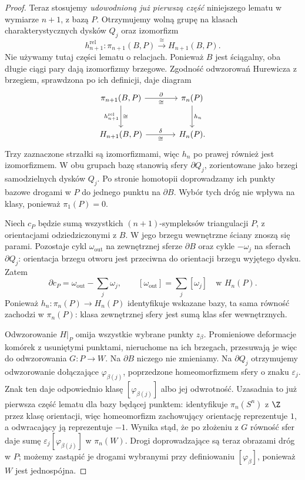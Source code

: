 \begin{proof}
Teraz stosujemy \emph{udowodnioną już pierwszą część}
niniejszego lematu w wymiarze $n+1$, z bazą $P$.
Otrzymujemy wolną grupę na klasach charakterystycznych
dysków $Q_j$ oraz izomorfizm
\[
 h_{n+1}^{\mathrm{rel}}:
 \pi_{n+1}(B,P)\xrightarrow{\ \cong\ }H_{n+1}(B,P).
\]
Nie używamy tutaj części lematu o relacjach.
Ponieważ $B$ jest ściągalny, oba długie ciągi pary dają
izomorfizmy brzegowe. Zgodność odwzorowań Hurewicza
z brzegiem, sprawdzona po ich definicji, daje diagram
\[
\begin{tikzcd}[column sep=large,row sep=large]
 \pi_{n+1}(B,P) \arrow[r,"\partial","\cong"']
  \arrow[d,"h_{n+1}^{\mathrm{rel}}" left,"\cong" right]
 &\pi_n(P) \arrow[d,"h_n"]\\
 H_{n+1}(B,P) \arrow[r,"\delta","\cong"']
 &H_n(P).
\end{tikzcd}
\]
Trzy zaznaczone strzałki są izomorfizmami, więc $h_n$
po prawej również jest izomorfizmem. W obu grupach bazę
stanowią sfery $\partial Q_j$, zorientowane jako brzegi
samodzielnych dysków $Q_j$. Po stronie homotopii doprowadzamy
ich punkty bazowe drogami w $P$ do jednego punktu na $\partial B$.
Wybór tych dróg nie wpływa na klasy, ponieważ $\pi_1(P)=0$.

Niech $c_P$ będzie sumą wszystkich $(n+1)$-sympleksów
triangulacji $P$, z orientacjami odziedziczonymi z $B$.
W jego brzegu wewnętrzne ściany znoszą się parami.
Pozostaje cykl $\omega_{\mathrm{out}}$ na zewnętrznej
sferze $\partial B$ oraz cykle $-\omega_j$ na sferach
$\partial Q_j$: orientacja brzegu otworu jest przeciwna
do orientacji brzegu wyjętego dysku. Zatem
\[
 \partial c_P=\omega_{\mathrm{out}}-\sum_j\omega_j,
 \qquad
 [\omega_{\mathrm{out}}]=\sum_j[\omega_j]
 \quad\text{w }H_n(P).
\]
Ponieważ $h_n:\pi_n(P)\to H_n(P)$ identyfikuje wskazane
bazy, ta sama równość zachodzi w $\pi_n(P)$:
klasa zewnętrznej sfery jest sumą klas sfer wewnętrznych.

Odwzorowanie $H|_P$ omija wszystkie wybrane punkty $z_\beta$.
Promieniowe deformacje komórek z usuniętymi punktami,
nieruchome na ich brzegach, przesuwają je więc do
odwzorowania $G:P\to W$. Na $\partial B$ niczego nie zmieniamy.
Na $\partial Q_j$ otrzymujemy odwzorowanie dołączające
$\varphi_{\beta(j)}$, poprzedzone homeomorfizmem sfery
o znaku $\varepsilon_j$. Znak ten daje odpowiednio klasę
$[\varphi_{\beta(j)}]$ albo jej odwrotność.
Uzasadnia to już pierwsza część lematu dla bazy będącej
punktem: identyfikuje $\pi_n(S^n)$ z $\Z$ przez klasę orientacji,
więc homeomorfizm zachowujący orientację reprezentuje $1$,
a odwracający ją reprezentuje $-1$.
Wynika stąd, że po złożeniu z $G$ równość sfer daje
sumę $\varepsilon_j[\varphi_{\beta(j)}]$ w $\pi_n(W)$.
Drogi doprowadzające są teraz obrazami dróg w $P$;
możemy zastąpić je drogami wybranymi przy definiowaniu
$[\varphi_\beta]$, ponieważ $W$ jest jednospójna.


\end{proof}
